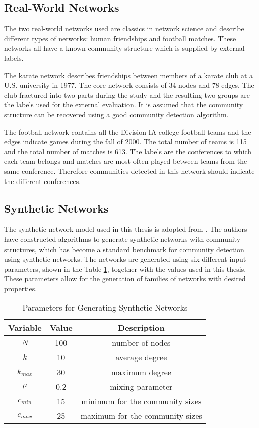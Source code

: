\documentclass[\main/thesis.tex]{subfiles}
\begin{document}
\subsection*{Real-World Networks}
The two real-world networks used are classics in network science and describe different types of networks: human friendships and football matches. These networks all have a known community structure which is supplied by external labels. 

The karate network \cite{zachary1977information} describes friendships between members of a karate club at a U.S. university in 1977. The core network consists of 34 nodes and 78 edges. The club fractured into two parts during the study and the resulting two groups are the labels used for the external evaluation. It is assumed that the community structure can be recovered using a good community detection algorithm.

The football network \cite{girvan2002community} contains all the Division IA college football teams and the edges indicate games during the fall of 2000. The total number of teams is 115 and the total number of matches is 613. The labels are the conferences to which each team belongs and matches are most often played between teams from the same conference. Therefore communities detected in this network should indicate the different conferences. 
\subsection*{Synthetic Networks}
The synthetic network model used in this thesis is adopted from \cite{lancichinetti2009benchmarks}. The authors have constructed algorithms to generate synthetic networks with community structures, which has become a standard benchmark for community detection using synthetic networks. The networks are generated using six different input parameters, shown in the Table \ref{synthetic_network_parameter}, together with the values used in this thesis. These parameters allow for the generation of families of networks with desired properties.
\begin{table}[]
\centering
\caption{Parameters for Generating Synthetic Networks}
\label{synthetic_network_parameter}
\begin{tabular}{ccc}
\hline
Variable & Value & Description                     \\ \hline
$N$     & 100   & number of nodes                 \\
$k$     & 10    & average degree                  \\
$k_{max}$  & 30    & maximum degree                  \\
$\mu$ & 0.2   & mixing parameter                \\
$c_{min}$  & 15    & minimum for the community sizes \\
$c_{max}$  & 25    & maximum for the community sizes \\ \hline
\end{tabular}
\end{table}
\end{document}
